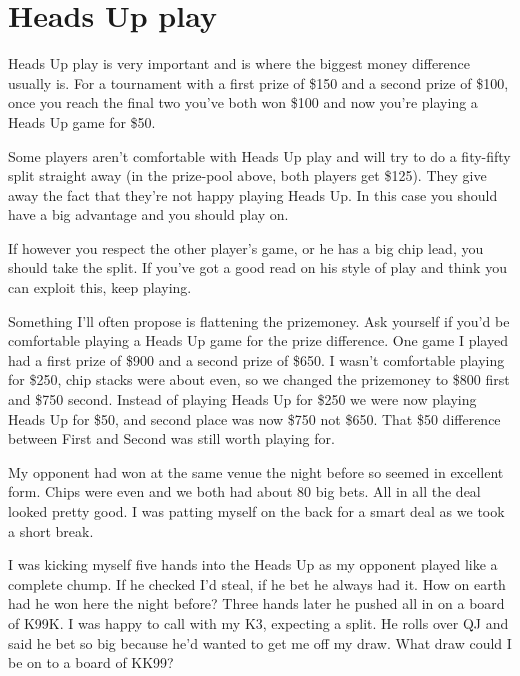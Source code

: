 \chapter{Heads Up play}


Heads Up play is very important and is where the biggest money
difference usually is. For a tournament with
a first prize of \$150 and a second prize of \$100, once
you reach the final two you've both won \$100 and now you're
playing a Heads Up game for \$50.



Some players aren't comfortable with Heads Up play
and will try to do a fity-fifty split straight away (in the prize-pool
above, both players get \$125). They give away the
fact that they're not happy playing Heads Up. In this case
you should have a big advantage and you should play on.

If however you respect the other player's game, or he
has a big chip lead, you should take the split. If you've
got a good read on his style of play and think you
can exploit this, keep playing.

Something I'll often propose is flattening the prizemoney.
Ask yourself if you'd be comfortable playing a Heads Up
game for the prize difference. One game I played had
a first prize of \$900 and a second prize of \$650. I wasn't
comfortable playing for \$250, chip stacks were about even,
so we changed the prizemoney to \$800 first and \$750 second.
Instead of playing Heads Up for \$250 we were now playing
Heads Up for \$50, and second place was now \$750
not \$650. That \$50 difference between
First and Second was still worth playing for.

My opponent had won at the same venue the night before
so seemed in excellent form. Chips were even and we both
had about 80 big bets. All in all the deal looked
pretty good. I was patting myself on the back for a smart
deal as we took a short break.

I was kicking myself five hands into the
Heads Up as my opponent played like a complete chump.
If he checked I'd steal, if he bet he always had it.
How on earth had he won here the night before?
Three hands later he pushed all in on a board of K99K.
I was happy to call with my K3, expecting a split.
He rolls over QJ and said he bet so big because he'd
wanted to get me off my draw. What draw could I be
on to a board of KK99?

